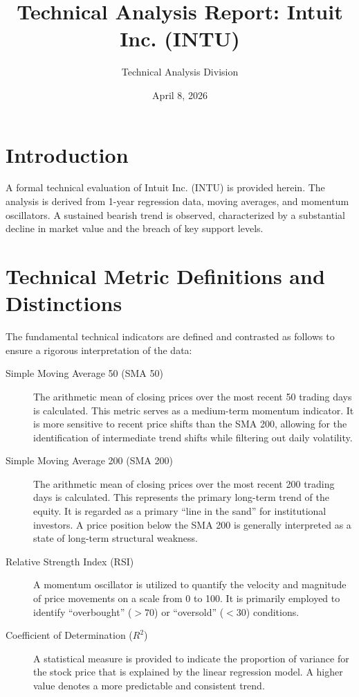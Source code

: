 \documentclass[letterpaper]{article}
\title{Technical Analysis Report: Intuit Inc. (INTU)}
\author{Technical Analysis Division}
\date{April 8, 2026}
\begin{document}
\maketitle

\section{Introduction}
A formal technical evaluation of Intuit Inc. (INTU) is provided herein. The analysis is derived from 1-year regression data, moving averages, and momentum oscillators. A sustained bearish trend is observed, characterized by a substantial decline in market value and the breach of key support levels.

\section{Technical Metric Definitions and Distinctions}
The fundamental technical indicators are defined and contrasted as follows to ensure a rigorous interpretation of the data:

\begin{description}
  \item[Simple Moving Average 50 (SMA 50)] The arithmetic mean of closing prices over the most recent 50 trading days is calculated. This metric serves as a medium-term momentum indicator. It is more sensitive to recent price shifts than the SMA 200, allowing for the identification of intermediate trend shifts while filtering out daily volatility.
  \item[Simple Moving Average 200 (SMA 200)] The arithmetic mean of closing prices over the most recent 200 trading days is calculated. This represents the primary long-term trend of the equity. It is regarded as a primary ``line in the sand'' for institutional investors. A price position below the SMA 200 is generally interpreted as a state of long-term structural weakness.
  \item[Relative Strength Index (RSI)] A momentum oscillator is utilized to quantify the velocity and magnitude of price movements on a scale from 0 to 100. It is primarily employed to identify ``overbought'' ($> 70$) or ``oversold'' ($< 30$) conditions.
  \item[Coefficient of Determination ($R^2$)] A statistical measure is provided to indicate the proportion of variance for the stock price that is explained by the linear regression model. A higher value denotes a more predictable and consistent trend.
\end{description}
\end{document}
